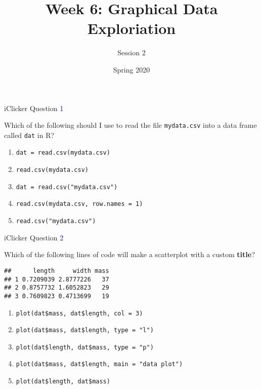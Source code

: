 \documentclass[ignorenonframetext,t]{beamer}
\title{Week 6: Graphical Data Exploriation}
\subtitle{Session 2}
\date{Spring 2020}
\begin{document}
\frame{\titlepage}

\begin{frame}[fragile]{iClicker Question \textcolor{blue}{1}}

Which of the following should I use to read the file \texttt{mydata.csv}
into a data frame called \texttt{dat} in R?

\begin{enumerate}[A]
\item \texttt{dat = read.csv(mydata.csv)}
\item \texttt{read.csv(mydata.csv)}
\item \texttt{dat = read.csv("mydata.csv")}
\item \texttt{read.csv(mydata.csv, row.names = 1)}
\item \texttt{read.csv("mydata.csv")}
\end{enumerate}

\vfill


\end{frame}

\begin{frame}[fragile]{iClicker Question \textcolor{blue}{2}}

Which of the following lines of code will make a scatterplot with a
custom \textbf{title}?

\begin{verbatim}
##      length     width mass
## 1 0.7209039 2.8777226   37
## 2 0.8757732 1.6052823   29
## 3 0.7609823 0.4713699   19
\end{verbatim}

\begin{enumerate}[A]
\item \texttt{plot(dat\$mass, dat\$length, col = 3)}
\item \texttt{plot(dat\$mass, dat\$length, type = "l")}
\item \texttt{plot(dat\$length, dat\$mass, type = "p")}
\item \texttt{plot(dat\$mass, dat\$length, main = "data plot")}
\item \texttt{plot(dat\$length, dat\$mass)}
\end{enumerate}

\vfill


\end{frame}
\end{document}
